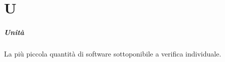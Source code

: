 \chapter{U}
\paragraph*{Unità}
La più piccola quantità di software sottoponibile a verifica individuale.